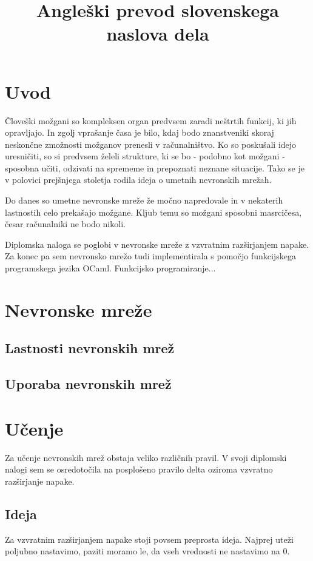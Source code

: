 \documentclass[mat1]{fmfdelo}
\title{Angleški prevod slovenskega naslova dela}
\begin{document}
\section{Uvod}

Človeški možgani so kompleksen organ predvsem zaradi neštrtih funkcij, ki jih opravljajo. In zgolj vprašanje časa je bilo, kdaj bodo znanstveniki skoraj neskončne zmožnosti možganov prenesli v računalništvo. Ko so poskušali idejo uresničiti, so si predvsem želeli strukture, ki se bo - podobno kot možgani - sposobna učiti, odzivati na sprememe in prepoznati neznane situacije. Tako se je v polovici prejšnjega stoletja rodila ideja o umetnih nevronskih mrežah. 

Do danes so umetne nevronske mreže že močno napredovale in v nekaterih lastnostih celo prekašajo možgane. Kljub temu so možgani sposobni masrcičesa, česar računalniki ne bodo nikoli.

Diplomska naloga se poglobi v nevronske mreže z vzvratnim razširjanjem napake. Za konec pa sem nevronsko mrežo tudi implementirala s pomočjo funkcijskega programskega jezika OCaml. Funkcijsko programiranje...



\section{Nevronske mreže}

\subsection{Lastnosti nevronskih mrež}

\subsection{Uporaba nevronskih mrež}

\section{Učenje}
Za učenje nevronskih mrež obstaja veliko različnih pravil. V svoji diplomski nalogi sem se osredotočila na posplošeno pravilo delta oziroma vzvratno razširjanje napake. 
\subsection{Ideja}
Za vzvratnim razširjanjem napake stoji povsem preprosta ideja. Najprej uteži poljubno nastavimo, paziti moramo le, da vseh vrednosti ne nastavimo na $0$.
\end{document}
